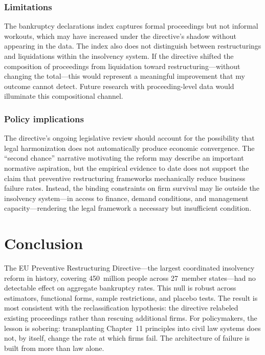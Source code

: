 \documentclass[12pt]{article}
\begin{document}
\subsubsection*{Limitations} The bankruptcy declarations index captures formal proceedings but not informal workouts, which may have increased under the directive's shadow without appearing in the data. The index also does not distinguish between restructurings and liquidations within the insolvency system. If the directive shifted the composition of proceedings from liquidation toward restructuring---without changing the total---this would represent a meaningful improvement that my outcome cannot detect. Future research with proceeding-level data would illuminate this compositional channel.

\subsubsection*{Policy implications} The directive's ongoing legislative review should account for the possibility that legal harmonization does not automatically produce economic convergence. The ``second chance'' narrative motivating the reform may describe an important normative aspiration, but the empirical evidence to date does not support the claim that preventive restructuring frameworks mechanically reduce business failure rates. Instead, the binding constraints on firm survival may lie outside the insolvency system---in access to finance, demand conditions, and management capacity---rendering the legal framework a necessary but insufficient condition.


\section{Conclusion}

The EU Preventive Restructuring Directive---the largest coordinated insolvency reform in history, covering 450~million people across 27~member states---had no detectable effect on aggregate bankruptcy rates. This null is robust across estimators, functional forms, sample restrictions, and placebo tests. The result is most consistent with the reclassification hypothesis: the directive relabeled existing proceedings rather than rescuing additional firms. For policymakers, the lesson is sobering: transplanting Chapter~11 principles into civil law systems does not, by itself, change the rate at which firms fail. The architecture of failure is built from more than law alone.
\end{document}
